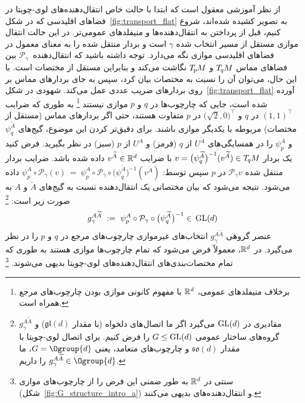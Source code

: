 از نظر آموزشی معقول است که ابتدا با حالت خاص انتقال‌دهنده‌های لوی-چویتا در فضاهای اقلیدسی که در شکل~\ref{fig:transport_flat} به تصویر کشیده شده‌اند، شروع کنیم، قبل از پرداختن به انتقال‌دهنده‌ها و منیفلدهای عمومی‌تر.
در این حالت انتقال موازی مستقل از مسیر انتخاب شده $\gamma$ است و بردار منتقل شده را به معنای معمول در فضاهای اقلیدسی موازی نگه می‌دارد.
توجه داشته باشید که انتقال‌دهنده~$\mathcal{P}_\gamma$ بین فضاهای مماس $T_{\mkern-1.5mu q}\mkern-.5muM$ و $T_{\mkern-1.5mu p}\mkern-.5muM$ نگاشت می‌کند و بنابراین مستقل از مختصات است.
با این حال، می‌توان آن را نسبت به مختصات بیان کرد، سپس به جای بردارهای مماس بر روی بردارهای ضریب عددی عمل می‌کند.
شهودی در شکل~\ref{fig:transport_flat} آورده شده است، جایی که چارچوب‌ها در $q$ و $p$ موازی نیستند%
\footnote{
    برخلاف منیفلدهای عمومی، $\mathbb{R}^d$ با مفهوم کانونی موازی بودن چارچوب‌های مرجع همراه است.
}
به طوری که ضرایب $(1,1)^\top$ در $q$ و $\big(\sqrt{2},0\big)^\top$ در $p$ متفاوت هستند، حتی اگر بردارهای مماس (مستقل از مختصات) مربوطه با یکدیگر موازی باشند.
برای دقیق‌تر کردن این موضوع، گیج‌های $\psi_q^{\widetilde{A}}$ و $\psi_p^A$ را در همسایگی‌های $U^{\widetilde{A}}$ از $q$ (قرمز) و $U^A$ از $p$ (سبز) در نظر بگیرید.
فرض کنید یک بردار $v = \big( \psi_q^{\widetilde{A}} \big)^{-1} (v^{\widetilde{A}}) \in T_{\mkern-1.5mu q}\mkern-.5muM$ با ضرایب $v^{\widetilde{A}} \in \mathbb{R}^d$ داده شده باشد.
ضرایب بردار منتقل شده $\mathcal{P}_\gamma v$ در $p$ سپس توسط:
$
\psi_p^A \circ \mathcal{P}_\gamma (v)
\ =\ \psi_p^A \circ \mathcal{P}_\gamma \circ \big(\psi_q^{\widetilde{A}}\big)^{-1} (v^{\widetilde{A}})
$
داده می‌شود.
نتیجه می‌شود که بیان مختصاتی یک انتقال‌دهنده نسبت به گیج‌های $\widetilde{A}$ و $A$ به صورت زیر است:%
\footnote{
    $g_\gamma^{A\widetilde{A}}$ مقادیری در $\operatorname{GL}(d)$ می‌گیرد اگر ما اتصال‌های دلخواه (با مقدار $\mathfrak{gl}(d)$) و گروه‌های ساختار عمومی $G\leq\operatorname{GL}(d)$ را فرض کنیم.
    برای اتصال لوی-چویتا با مقدار $\mathfrak{so}(d)$ و چارچوب‌های متعامد، یعنی $G=\Ogroup{d}$، ما $g_\gamma^{A\widetilde{A}} \in \Ogroup{d}$ را داریم.
}
\begin{align}\label{eq:transporter_gauge}
    g_\gamma^{A\widetilde{A}} \ :=\ \psi_p^A \circ \mathcal{P}_\gamma \circ \big( \psi_q^{\widetilde{A}} \mkern1mu\big)^{-1} \in\, \operatorname{GL}(d)
\end{align}
عنصر گروهی $g_\gamma^{A\widetilde{A}}$ انتخاب‌های غیرموازی چارچوب‌های مرجع در $q$ و $p$ را در نظر می‌گیرد.
در $\mathbb{R}^d$، معمولاً فرض می‌شود که تمام چارچوب‌ها موازی هستند به طوری که تمام مختصات‌بندی‌های انتقال‌دهنده‌های لوی-چویتا بدیهی می‌شوند.%
\footnote{
     سنتی در $\mathbb{R}^d$ به طور ضمنی این فرض را از چارچوب‌های موازی (شکل~\ref{fig:G_structure_intro_a}) و انتقال‌دهنده‌های بدیهی می‌کنند.
}

